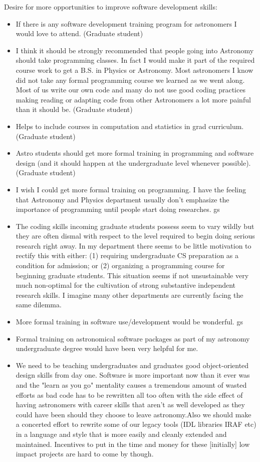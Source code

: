 \begin{appendix}
Desire for more opportunities to improve software development skills:

\begin{itemize}
\item{If there is any software development training program for astronomers I would love to attend. (Graduate student)}
\item{I think it should be strongly recommended that people going into Astronomy should take programming classes. In fact I would make it part of the required course work to get a B.S. in Physics or Astronomy. Most astronomers I know did not take any formal programming course we learned as we went along. Most of us write our own code and many do not use good coding practices making reading or adapting code from other Astronomers a lot more painful than it should be. (Graduate student)}
\item{Helps to include courses in computation and statistics in grad curriculum. (Graduate student)}
\item{Astro students should get more formal training in programming and software design (and it should happen at the undergraduate level whenever possible). (Graduate student)}
\item{I wish I could get more formal training on programming. I have the feeling that Astronomy and Physics department usually don't emphasize the importance of programming until people start doing researches. gs}
\item{The coding skills incoming graduate students possess seem to vary wildly but they are often dismal with respect to the level required to begin doing serious research right away. In my department there seems to be little motivation to rectify this with either: (1) requiring undergraduate CS preparation as a condition for admission; or (2) organizing a programming course for beginning graduate students. This situation seems if not unsustainable very much non-optimal for the cultivation of strong substantive independent research skills. I imagine many other departments are currently facing the same dilemma.}
\item{More formal training in software use/development would be wonderful. gs}
\item{Formal training on astronomical software packages as part of my astronomy undergraduate degree would have been very helpful for me.}
\item{We need to be teaching undergraduates and graduates good object-oriented design skills from day one. Software is more important now than it ever was and the "learn as you go" mentality causes a tremendous amount of wasted efforts as bad code has to be rewritten all too often with the side effect of having astronomers with career skills that aren't as well developed as they could have been should they choose to leave astronomy.Also we should make a concerted effort to rewrite some of our legacy tools (IDL libraries IRAF etc) in a language and style that is more easily and cleanly extended and maintained. Incentives to put in the time and money for these [initially] low impact projects are hard to come by though.}


\end{itemize}
\end{appendix}
